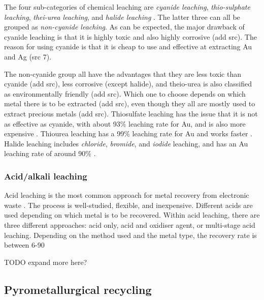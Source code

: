 The four sub-categories of chemical leaching are \textit{cyanide leaching}, \textit{thio-sulphate leaching}, \textit{thei-urea leaching}, and \textit{halide leaching} \cite{javed2024}. The latter three can all be grouped as \textit{non-cyanide leaching}. As can be expected, the major drawback of cyanide leaching is that it is highly toxic and also highly corrosive (add src). The reason for using cyanide is that it is cheap to use and effective at extracting Au and Ag (src 7).

The non-cyanide group all have the advantages that they are less toxic than cyanide (add src), less corrosive (except halide), and theio-urea is also classified as environmentally friendly (add src). Which one to choose depends on which metal there is to be extracted (add src), even though they all are mostly used to extract precious metals (add src). Thiosulfate leaching has the issue that it is not as effective as cyanide, with about 93\% leaching rate for Au, and is also more expensive \cite{javed2024}. Thiourea leaching has a 99\% leaching rate for Au and works faster \cite{javed2024}. Halide leaching includes \textit{chloride}, \textit{bromide}, and \textit{iodide} leaching, and has an Au leaching rate of around 90\% \cite{javed2024}.

\subsubsection{Acid/alkali leaching}

Acid leaching is the most common approach for metal recovery from electronic waste \cite{javed2024}. The process is well-studied, flexible, and inexpensive. Different acids are used depending on which metal is to be recovered. Within acid leaching, there are three different approaches: acid only, acid and oxidiser agent, or multi-stage acid leaching. Depending on the method used and the metal type, the recovery rate is between 6-90%

TODO expand more here?

\subsection{Pyrometallurgical recycling}

